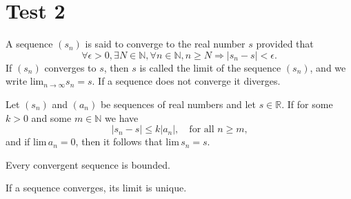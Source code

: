\documentclass[nobib,notoc]{tufte-handout}
\begin{document}
\section{Test 2}
\begin{defi}[Convergence]
	A sequence \((s_n)\) is said to converge to the real number \(s\) provided that
	\begin{equation*}
		\forall\epsilon>0,\exists N\in\mathbb{N},\forall n\in\mathbb{N},n\geq N\Rightarrow \lvert s_n-s\rvert<\epsilon.
	\end{equation*}
	If \((s_n)\) converges to \(s\), then \(s\) is called the limit of the sequence \((s_n)\), and we write \(\text{lim}_{n\rightarrow\infty}s_n=s\). If a sequence does not converge it diverges.
\end{defi}
\begin{thm}
	Let \((s_n)\) and \((a_n)\) be sequences of real numbers and let \(s\in\mathbb{R}\). If for some \(k>0\) and some \(m\in\mathbb{N}\) we have
	\begin{equation*}
		\lvert s_n-s\rvert\leq k\lvert a_n\rvert,\quad\text{for all \(n\geq m\),}
	\end{equation*}
	and if \(\text{lim}\,a_n=0\), then it follows that \(\text{lim}\,s_n=s\).
\end{thm}
\begin{thm}
	Every convergent sequence is bounded.
\end{thm}
\begin{thm}
	If a sequence converges, its limit is unique.
\end{thm}
\end{document}
